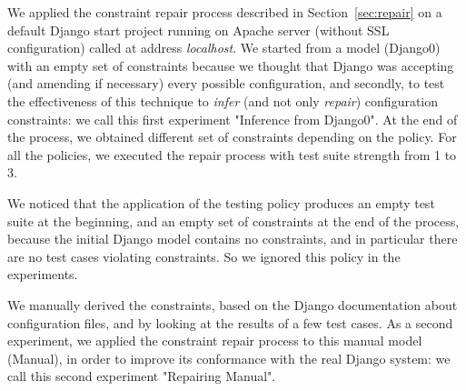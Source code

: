 \begin{tikzborder}{\cite{Gargantini16:validation}}
\begin{tikzborder}{\cite{gargantini_combinatorial_2017}}
We applied the constraint repair process described in Section~\ref{sec:repair} on a default Django start project running on Apache server (without SSL configuration) called at address \emph{localhost}. We started from a model (Django0) with an empty set of constraints because we thought that Django was accepting (and amending if necessary) every possible configuration, and secondly, to test the effectiveness of this technique to \emph{infer} (and not only \emph{repair}) configuration constraints: we call this first experiment "\textsf{Inference from Django0}".
At the end of the process, we obtained different set of constraints depending on the policy.
For all the policies, we executed the repair process with test suite strength from 1 to 3.

We noticed that the application of the testing policy \cv produces an empty test suite at the beginning, and an empty set of constraints at the end of the process, because the initial Django model contains no constraints, and in particular there are no test cases violating constraints. So we ignored this policy in the experiments.

We manually derived the constraints, based on the Django documentation about configuration files, and by looking at the results of a few test cases. As a second experiment, we applied the constraint repair process to this manual model (\textsf{Manual}), in order to improve its conformance with the real Django system: we call this second experiment "\textsf{Repairing Manual}".\be


\end{tikzborder}
\end{tikzborder}
